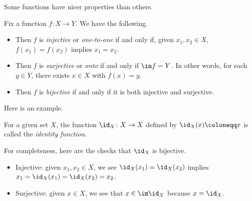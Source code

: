 \documentclass[../notes.tex]{subfiles}
\begin{document}
Some functions have nicer properties than others.
\begin{definition}
	Fix a function $f\colon X\to Y$. We have the following.
	\begin{itemize}
		\item Then $f$ is \textit{injective} or \textit{one-to-one} if and only if, given $x_1,x_2\in X$, $f(x_1)=f(x_2)$ implies $x_1=x_2$.
		\item Then $f$ is \textit{surjective} or \textit{onto} if and only if $\im f=Y$. In other words, for each $y\in Y$, there exists $x\in X$ with $f(x)=y$.
		\item Then $f$ is \textit{bijective} if and only if it is both injective and surjective.
	\end{itemize}
\end{definition}
Here is an example.
\begin{definition}[Identity]
	For a given set $X$, the function $\id_X\colon X\to X$ defined by $\id_X(x)\coloneqq x$ is called the \textit{identity function}.
\end{definition}
For completeness, here are the checks that $\id_X$ is bijective.
\begin{itemize}
	\item Injective: given $x_1,x_2\in X$, we see $\id_X(x_1)=\id_X(x_2)$ implies $x_1=\id_X(x_1)=\id_X(x_2)=x_2$.
	\item Surjective: given $x\in X$, we see that $x\in\im\id_X$ because $x=\id_X$.
\end{itemize}
\end{document}
